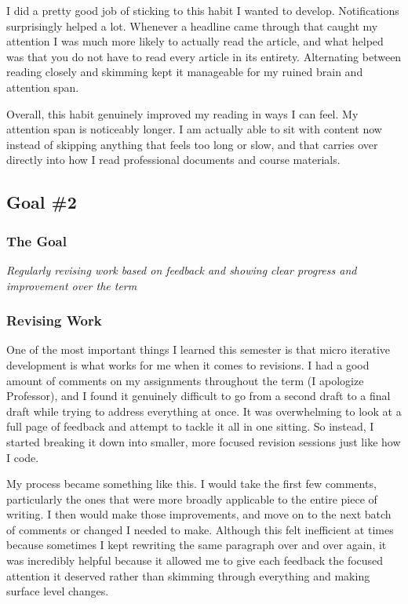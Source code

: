 \documentclass[12pt]{article}
\begin{document}
            I did a pretty good job of sticking to this habit I wanted to develop. Notifications surprisingly helped a lot. Whenever a headline came through that caught my attention I was much more likely to actually read the article, and what helped was that you do not have to read every article in its entirety. Alternating between reading closely and skimming kept it manageable for my ruined brain and attention span.

            Overall, this habit genuinely improved my reading in ways I can feel. My attention span is noticeably longer. I am actually able to sit with content now instead of skipping anything that feels too long or slow, and that carries over directly into how I read professional documents and course materials.

        \newpage
        \subsection{Goal \#2}

            \subsubsection*{The Goal}
            \textit{Regularly revising work based on feedback and showing clear progress and improvement over the term}

            \subsubsection{Revising Work}
            \label{sec:revising-work}

            One of the most important things I learned this semester is that micro iterative development is what works for me when it comes to revisions. I had a good amount of comments on my assignments throughout the term (I apologize Professor), and I found it genuinely difficult to go from a second draft to a final draft while trying to address everything at once. It was overwhelming to look at a full page of feedback and attempt to tackle it all in one sitting. So instead, I started breaking it down into smaller, more focused revision sessions just like how I code.

            My process became something like this. I would take the first few comments, particularly the ones that were more broadly applicable to the entire piece of writing. I then would make those improvements, and move on to the next batch of comments or changed I needed to make. Although this felt inefficient at times because sometimes I kept rewriting the same paragraph over and over again, it was incredibly helpful because it allowed me to give each feedback the focused attention it deserved rather than skimming through everything and making surface level changes.
\end{document}
